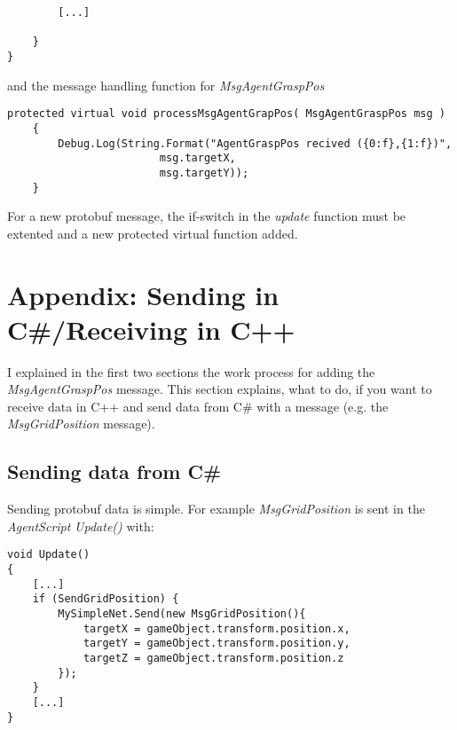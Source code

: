 \documentclass[a4paper,11pt,oneside,pdftex]{scrartcl}
\begin{document}
\begin{enumerate}
\begin{lstlisting}
		[...]

	}
}\end{lstlisting}
and the message handling function for \emph{MsgAgentGraspPos}
\begin{lstlisting}
protected virtual void processMsgAgentGrapPos( MsgAgentGraspPos msg )
    {
        Debug.Log(String.Format("AgentGraspPos recived ({0:f},{1:f})",
                        msg.targetX,
                        msg.targetY));
    }
\end{lstlisting}





For a new protobuf message, the if-switch in the \emph{update} function must be extented and a new protected virtual function added.



\end{enumerate}

\newpage
\section{Appendix: Sending in C\#/Receiving in C++}

I explained in the first two sections the work process for adding the \emph{MsgAgentGraspPos} message. This section explains, what to do, if you want to receive data in C++ and send data from C\# with a message (e.g. the \emph{MsgGridPosition} message).

\subsection*{Sending data from C\#}

Sending protobuf data is simple. For example \emph{MsgGridPosition} is sent in the \emph{AgentScript} \emph{Update()} with:
\begin{lstlisting}
void Update()
{
	[...]
	if (SendGridPosition) {
		MySimpleNet.Send(new MsgGridPosition(){
			targetX = gameObject.transform.position.x,
			targetY = gameObject.transform.position.y,
			targetZ = gameObject.transform.position.z
		});
	}
	[...]
}
\end{lstlisting}
\end{document}

